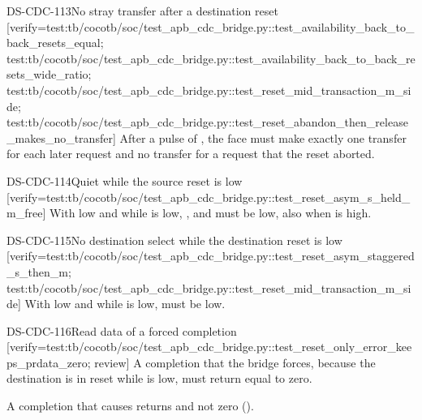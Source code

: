 \begin{requirement}{DS-CDC-113}{No stray transfer after a destination reset}
[verify={test:tb/cocotb/soc/test_apb_cdc_bridge.py::test_availability_back_to_back_resets_equal; test:tb/cocotb/soc/test_apb_cdc_bridge.py::test_availability_back_to_back_resets_wide_ratio; test:tb/cocotb/soc/test_apb_cdc_bridge.py::test_reset_mid_transaction_m_side; test:tb/cocotb/soc/test_apb_cdc_bridge.py::test_reset_abandon_then_release_makes_no_transfer}]
After a pulse of , the  face must make exactly one transfer for each later request and no transfer for a request that the reset aborted.
\end{requirement}

\begin{requirement}{DS-CDC-114}{Quiet while the source reset is low}
[verify={test:tb/cocotb/soc/test_apb_cdc_bridge.py::test_reset_asym_s_held_m_free}]
With  low and while  is low, ,  and  must be low, also when  is high.
\end{requirement}

\begin{requirement}{DS-CDC-115}{No destination select while the destination reset is low}
[verify={test:tb/cocotb/soc/test_apb_cdc_bridge.py::test_reset_asym_staggered_s_then_m; test:tb/cocotb/soc/test_apb_cdc_bridge.py::test_reset_mid_transaction_m_side}]
With  low and while  is low,  must be low.
\end{requirement}

\begin{requirement}{DS-CDC-116}{Read data of a forced completion}
[verify={test:tb/cocotb/soc/test_apb_cdc_bridge.py::test_reset_only_error_keeps_prdata_zero; review}]
A completion that the bridge forces, because the destination is in reset while  is low, must return  equal to zero.
\end{requirement}
\begin{information}
A completion that  causes returns  and not zero ().
\end{information}

